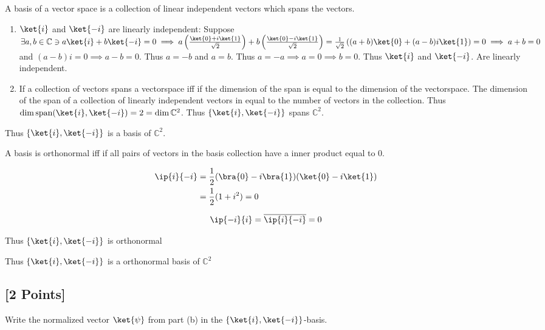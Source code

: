 \documentclass[11pt]{article}
\begin{document}
\begin{solution}
	A basis of a vector space is a collection of linear independent vectors which spans the vectors. 

	\begin{enumerate}
		\item $\ket{i}$ and $\ket{-i}$ are linearly independent: Suppose $\exists a, b \in \mathbb{C} \ni a \ket{i} + b \ket{-i} = 0 \implies a \left(\frac{\ket{0} + i\ket{1}}{\sqrt{2}}\right) + b \left(\frac{\ket{0} - i\ket{1}}{\sqrt{2}}\right) = \frac{1}{\sqrt{2}} \left((a + b)\ket{0} + (a - b) i \ket{1}\right) = 0 \implies a + b =0$ and $(a - b) i = 0 \implies a - b = 0$. Thus $a = -b$ and $a = b$. Thus $a = -a \implies a = 0 \implies b = 0$. Thus $\ket{i}$ and $\ket{-i}$. Are linearly independent. 
		\item If a collection of vectors spans a vectorspace iff if the dimension of the span is equal to the dimension of the vectorspace. The dimension of the span of a collection of linearly independent vectors in equal to the number of vectors in the collection. Thus $\dim \text{span}(\ket{i}, \ket{-i}) = 2 = \dim \mathbb{C}^2$. Thus $\left\{ \ket{i}, \ket{-i} \right\}$ spans $\mathbb{C}^2$. 
	\end{enumerate}

	Thus $\left\{ \ket{i}, \ket{-i} \right\}$ is a basis of $\mathbb{C}^2$. 
	
	A basis is orthonormal iff if all pairs of vectors in the basis collection have a inner product equal to 0. 

	\begin{align*}
		\ip{i}{-i} &= \frac{1}{2}(\bra{0} - i \bra{1})(\ket{0} - i \ket{1})\\
		&= \frac{1}{2}(1 + i^2) = 0
	\end{align*}

	\begin{align*}
		\ip{-i}{i} = \overline{\ip{i}{-i}} = 0
	\end{align*}

	Thus $\left\{ \ket{i}, \ket{-i} \right\}$ is orthonormal  

	Thus $\left\{ \ket{i}, \ket{-i} \right\}$ is a orthonormal basis of $\mathbb{C}^2$ 
	
\end{solution}


\subsection{[2 Points]} Write the normalized vector $\ket{\psi}$ from part (b) in the $\{\ket{i}, \ket{-i}\}$-basis.
\end{document}
